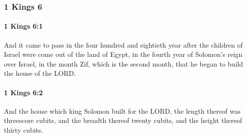 	\subsubsection{1 Kings 6} %
		\label{1KINGS-6}

		\paragraph{1 Kings 6:1} %
			\label{1KINGS-6-1}

			And it came to pass in the four hundred and eightieth year after the children of Israel were come out of the land of Egypt, in the fourth year of Solomon’s reign over Israel, in the month Zif, which is the second month, that he began to build the house of the LORD.


		\paragraph{1 Kings 6:2} %
			\label{1KINGS-6-2}

			And the house which king Solomon built for the LORD, the length thereof was threescore cubits, and the breadth thereof twenty cubits, and the height thereof thirty cubits.

